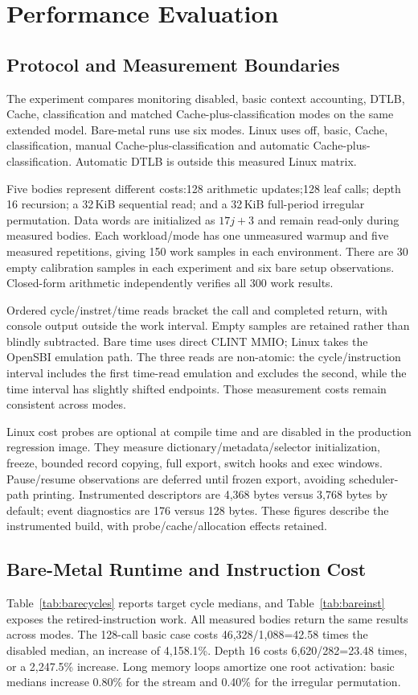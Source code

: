 \section{Performance Evaluation}
\label{sec:performance}
\subsection{Protocol and Measurement Boundaries}
The experiment compares monitoring disabled, basic context accounting, DTLB, Cache, classification and matched Cache-plus-classification modes on the same extended model. Bare-metal runs use six modes. Linux uses off, basic, Cache, classification, manual Cache-plus-classification and automatic Cache-plus-classification. Automatic DTLB is outside this measured Linux matrix.

Five bodies represent different costs:128 arithmetic updates;128 leaf calls; depth 16 recursion; a 32\,KiB sequential read; and a 32\,KiB full-period irregular permutation. Data words are initialized as $17j+3$ and remain read-only during measured bodies. Each workload/mode has one unmeasured warmup and five measured repetitions, giving 150 work samples in each environment. There are 30 empty calibration samples in each experiment and six bare setup observations. Closed-form arithmetic independently verifies all 300 work results.

Ordered cycle/instret/time reads bracket the call and completed return, with console output outside the work interval. Empty samples are retained rather than blindly subtracted. Bare time uses direct CLINT MMIO; Linux  takes the OpenSBI emulation path. The three reads are non-atomic: the cycle/instruction interval includes the first time-read emulation and excludes the second, while the time interval has slightly shifted endpoints. Those measurement costs remain consistent across modes.

Linux cost probes are optional at compile time and are disabled in the production regression image. They measure dictionary/metadata/selector initialization, freeze, bounded record copying, full export, switch hooks and exec windows. Pause/resume observations are deferred until frozen export, avoiding scheduler-path printing. Instrumented descriptors are 4,368 bytes versus 3,768 bytes by default; event diagnostics are 176 versus 128 bytes. These figures describe the instrumented build, with probe/cache/allocation effects retained.

\subsection{Bare-Metal Runtime and Instruction Cost}


Table~\ref{tab:barecycles} reports target cycle medians, and Table~\ref{tab:bareinst} exposes the retired-instruction work. All measured bodies return the same results across modes. The 128-call basic case costs 46,328/1,088=42.58 times the disabled median, an increase of 4,158.1\%. Depth 16 costs 6,620/282=23.48 times, or a 2,247.5\% increase. Long memory loops amortize one root activation: basic medians increase 0.80\% for the stream and 0.40\% for the irregular permutation.

